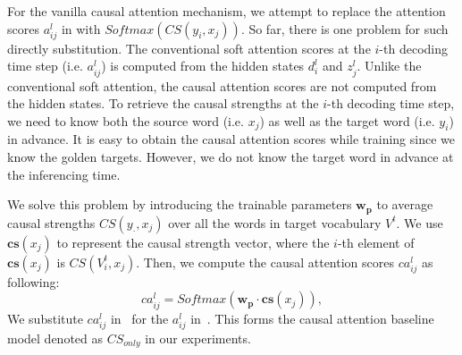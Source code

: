 For the vanilla causal attention mechanism, 
we attempt to replace the attention scores $a^l_{ij}$ in  with $Softmax\left( CS(y_i, x_j) \right)$.
So far, there is one problem for such directly substitution.
The conventional soft attention scores at the $i$-th decoding time step  (i.e. $a^{l}_{ij}$) is computed from the hidden states $d^l_i$ and $z^l_j$. 
Unlike the conventional soft attention,
the causal attention scores are not computed from the hidden states.
To retrieve the causal strengths at the $i$-th decoding time step, we need to know both the source word (i.e. $x_j$) as well as the target word (i.e. $y_i$) in advance.
It is easy to obtain the causal attention scores while training since we know the golden targets.
However, we do not know the target word in advance
at the inferencing time. 

We solve this problem by introducing the
trainable parameters $\mathbf{w_p}$ to average causal strengths $CS(y_{\cdot}, x_j)$ over all the words in target vocabulary $V^t$. We use $\mathbf{cs}(x_j)$ to represent
the causal strength vector, where  the $i$-th element of $\mathbf{cs}(x_j)$ is $CS(V^t_i, x_j)$.
Then, we compute the causal attention scores $ca^l_{ij}$ as following:
\begin{equation}
\label{eq:ca} %
ca^{l} _ { i j }= Softmax\left( \mathbf{w_p} \cdot
\mathbf{cs}(x_j) \right) ,
\end{equation}
We substitute $ca^{l} _ { i j }$ in~ for the $a^l_{ij}$ in~.
This forms the causal attention baseline model denoted as
$CS_{only}$ in our experiments.





